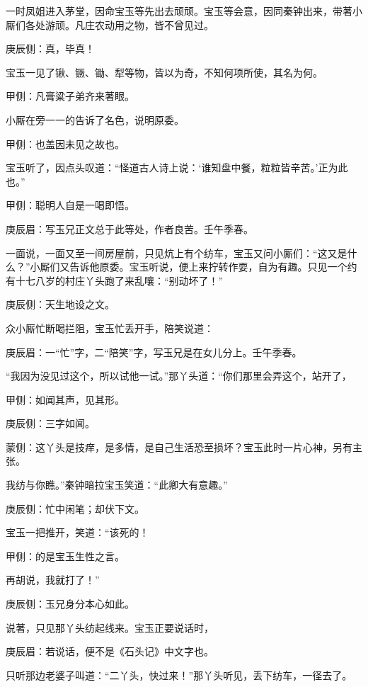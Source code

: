 \begin{parag}
    一时凤姐进入茅堂，因命宝玉等先出去顽顽。宝玉等会意，因同秦钟出来，带著小厮们各处游顽。凡庄农动用之物，皆不曾见过。\begin{note}庚辰侧：真，毕真！\end{note}宝玉一见了锹、镢、锄、犁等物，皆以为奇，不知何项所使，其名为何。\begin{note}甲侧：凡膏粱子弟齐来著眼。\end{note}小厮在旁一一的告诉了名色，说明原委。\begin{note}甲侧：也盖因未见之故也。\end{note}宝玉听了，因点头叹道：“怪道古人诗上说：‘谁知盘中餐，粒粒皆辛苦。’正为此也。”\begin{note}甲侧：聪明人自是一喝即悟。\end{note}\begin{note}庚辰眉：写玉兄正文总于此等处，作者良苦。壬午季春。\end{note}一面说，一面又至一间房屋前，只见炕上有个纺车，宝玉又问小厮们：“这又是什么？”小厮们又告诉他原委。宝玉听说，便上来拧转作耍，自为有趣。只见一个约有十七八岁的村庄丫头跑了来乱嚷：“别动坏了！”\begin{note}庚辰侧：天生地设之文。\end{note}众小厮忙断喝拦阻，宝玉忙丢开手，陪笑说道：\begin{note}庚辰眉：一“忙”字，二“陪笑”字，写玉兄是在女儿分上。壬午季春。\end{note}“我因为没见过这个，所以试他一试。”那丫头道：“你们那里会弄这个，站开了，\begin{note}甲侧：如闻其声，见其形。\end{note}\begin{note}庚辰侧：三字如闻。\end{note}\begin{note}蒙侧：这丫头是技痒，是多情，是自己生活恐至损坏？宝玉此时一片心神，另有主张。\end{note}我纺与你瞧。”秦钟暗拉宝玉笑道：“此卿大有意趣。”\begin{note}庚辰侧：忙中闲笔；却伏下文。\end{note}宝玉一把推开，笑道：“该死的！\begin{note}甲侧：的是宝玉生性之言。\end{note}再胡说，我就打了！”\begin{note}庚辰侧：玉兄身分本心如此。\end{note}说著，只见那丫头纺起线来。宝玉正要说话时，\begin{note}庚辰眉：若说话，便不是《石头记》中文字也。\end{note}只听那边老婆子叫道：“二丫头，快过来！”那丫头听见，丢下纺车，一径去了。
\end{parag}


